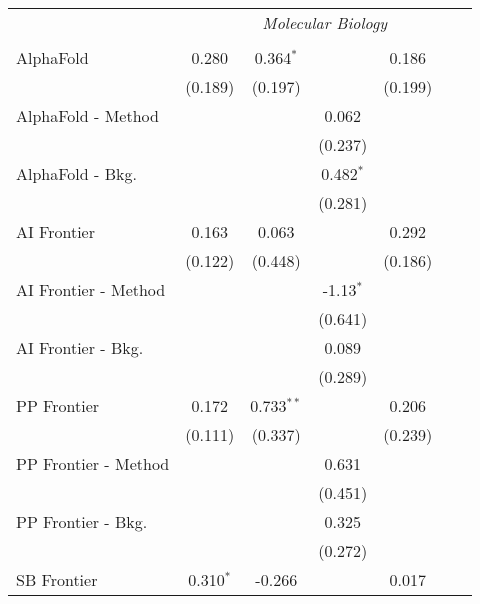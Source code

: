 \begin{tabular}{lcccccc}
 & \multicolumn{6}{c}{\textit{Molecular Biology}} \\ \\
   AlphaFold            & 0.280       & 0.364$^{*}$  &             & 0.186   &        &   \\   
                        & (0.189)     & (0.197)      &             & (0.199) &        &   \\   
   AlphaFold - Method   &             &              & 0.062       &         &        &   \\   
                        &             &              & (0.237)     &         &        &   \\   
   AlphaFold - Bkg.     &             &              & 0.482$^{*}$ &         &        &   \\   
                        &             &              & (0.281)     &         &        &   \\   
   AI Frontier          & 0.163       & 0.063        &             & 0.292   &        &   \\   
                        & (0.122)     & (0.448)      &             & (0.186) &        &   \\   
   AI Frontier - Method &             &              & -1.13$^{*}$ &         &        &   \\   
                        &             &              & (0.641)     &         &        &   \\   
   AI Frontier - Bkg.   &             &              & 0.089       &         &        &   \\   
                        &             &              & (0.289)     &         &        &   \\   
   PP Frontier          & 0.172       & 0.733$^{**}$ &             & 0.206   &        &   \\   
                        & (0.111)     & (0.337)      &             & (0.239) &        &   \\   
   PP Frontier - Method &             &              & 0.631       &         &        &   \\   
                        &             &              & (0.451)     &         &        &   \\   
   PP Frontier - Bkg.   &             &              & 0.325       &         &        &   \\   
                        &             &              & (0.272)     &         &        &   \\   
   SB Frontier          & 0.310$^{*}$ & -0.266       &             & 0.017   &        &   \\   

\end{tabular}
